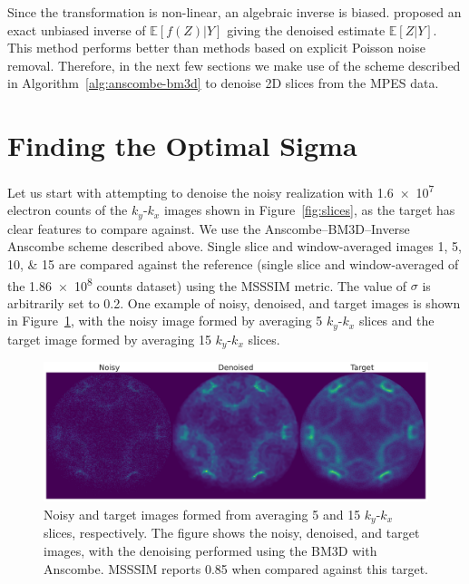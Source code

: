 Since the transformation is non-linear, an algebraic inverse is biased. \citeauthor{makitaloOptimalInversionAnscombe2011} \cite{makitaloOptimalInversionAnscombe2011} proposed an exact unbiased inverse of $\mathbb{E}[f(Z) | Y]$ giving the denoised estimate $\mathbb{E}[Z | Y]$. This method performs better than methods based on explicit Poisson noise removal. Therefore, in the next few sections we make use of the scheme described in Algorithm~\ref{alg:anscombe-bm3d} to denoise 2D slices from the \gls{MPES} data.

\section{Finding the Optimal Sigma}
Let us start with attempting to denoise the noisy realization with \num{1.6e7} electron counts of the $k_y$-$k_x$ images shown in Figure~\ref{fig:slices}, as the target has clear features to compare against. We use the Anscombe--\gls{BM3D}--Inverse Anscombe scheme described above. Single slice and window-averaged images \numlist{1;5;10;15} are compared against the reference (single slice and window-averaged of the \num{1.86e8} counts dataset) using the \gls{MSSSIM} metric. The value of $\sigma$ is arbitrarily set to \num{0.2}. One example of noisy, denoised, and target images is shown in Figure~\ref{fig:noisy-denoised-ref-16M-avg-bm3d}, with the noisy image formed by averaging 5 $k_y$-$k_x$ slices and the target image formed by averaging 15 $k_y$-$k_x$ slices.

\begin{figure}[h]
    \centering
    \includegraphics[width=1\linewidth]{images/noisy_denoised_ref_16M_avg_bm3d.pdf}
    \caption{Noisy and target images formed from averaging 5 and 15 $k_y$-$k_x$ slices, respectively. The figure shows the noisy, denoised, and target images, with the denoising performed using the \gls{BM3D} with Anscombe. \gls{MSSSIM} reports \num{0.85} when compared against this target.}
    \label{fig:noisy-denoised-ref-16M-avg-bm3d}
\end{figure}


